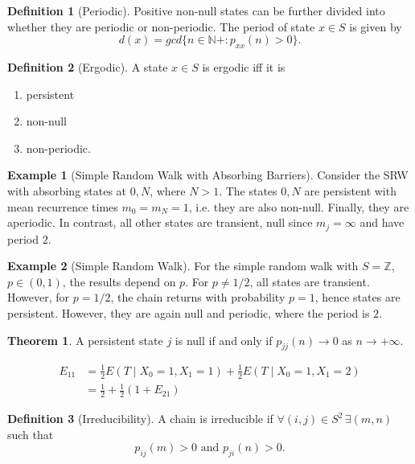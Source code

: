 \documentclass{article}
\theoremstyle{definition}
\newtheorem{exmp}{Example}[section]
\newtheorem{defn}{Definition}[section]
\newtheorem{theorem}{Theorem}[section]
\begin{document}
\begin{defn}[Periodic]
Positive non-null states can be further divided into whether they are periodic or non-periodic. 
The period of state $x \in S$ is given by
$$
d(x)= gcd \{n \in \mathbb{N}+: p_{xx}(n)>0 \}.
$$
\end{defn}

\begin{defn}[Ergodic]
A state $x \in S$ is ergodic iff it is
\begin{enumerate}
\item persistent
\item non-null
\item non-periodic.
\end{enumerate}
\end{defn}

\begin{exmp}[Simple Random Walk with Absorbing Barriers]
Consider the SRW with absorbing states at $0, N$, where $N > 1$. The states $0,N$ are persistent with mean recurrence times $m_0 = m_N = 1$, i.e. they are also non-null. Finally, they are aperiodic. In contrast, all other states are transient, null since $m_j = \infty$ and have period $2$.
\end{exmp}

\begin{exmp}[Simple Random Walk]
For the simple random walk with $S = \mathbb{Z}$, $p \in (0,1)$, the results depend on $p$. For $p \ne 1/2$, all states are transient. However, for $p=1/2$, the chain returns with probability $p=1$, hence states are persistent. However, they are again null and periodic, where the period is $2$.
\end{exmp}

\begin{theorem}
A persistent state $j$ is null if and only if $p_{jj}(n) \to 0$ as $n \to +\infty$.
\end{theorem}

\begin{align*}
E_{11} 
&= \frac{1}{2} E(T \mid X_0 = 1, X_1 = 1) + \frac{1}{2}  E(T \mid X_0 = 1, X_1 = 2) \\
&= \frac{1}{2} + \frac{1}{2} ( 1 + E_{21} ) 
\end{align*}

\begin{defn}[Irreducibility]
A chain is irreducible if $
\forall (i,j) \in S^2 \, \exists (m,n)$ such that 
$$
p_{ij}(m) > 0 \text{ and } p_{ji}(n) > 0.
$$
\end{defn}
\end{document}
